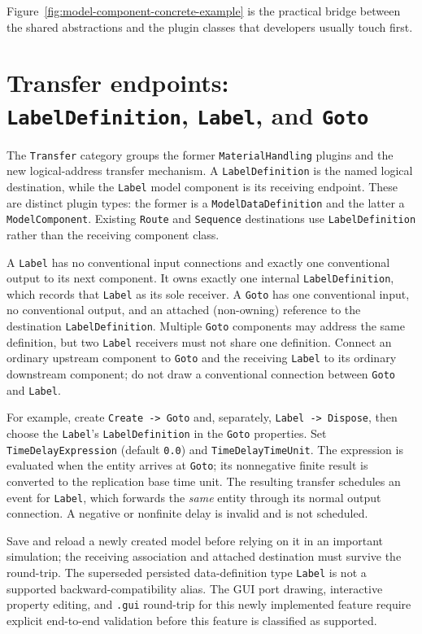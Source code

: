 Figure~\ref{fig:model-component-concrete-example} is the practical bridge
between the shared abstractions and the plugin classes that developers usually
touch first.


\section{Transfer endpoints: \texttt{LabelDefinition}, \texttt{Label}, and \texttt{Goto}}
\label{sec:transfer-label-goto-user}

The \texttt{Transfer} category groups the former \texttt{MaterialHandling}
plugins and the new logical-address transfer mechanism. A
\texttt{LabelDefinition} is the named logical destination, while the
\texttt{Label} model component is its receiving endpoint. These are distinct
plugin types: the former is a \texttt{ModelDataDefinition} and the latter a
\texttt{ModelComponent}. Existing \texttt{Route} and \texttt{Sequence}
destinations use \texttt{LabelDefinition} rather than the receiving component
class.

A \texttt{Label} has no conventional input connections and exactly one
conventional output to its next component. It owns exactly one internal
\texttt{LabelDefinition}, which records that \texttt{Label} as its sole
receiver. A \texttt{Goto} has one conventional input, no conventional
output, and an attached (non-owning) reference to the destination
\texttt{LabelDefinition}. Multiple \texttt{Goto} components may address the
same definition, but two \texttt{Label} receivers must not share one
definition. Connect an ordinary upstream component to \texttt{Goto} and the
receiving \texttt{Label} to its ordinary downstream component; do not draw a
conventional connection between \texttt{Goto} and \texttt{Label}.

For example, create \texttt{Create -> Goto} and, separately,
\texttt{Label -> Dispose}, then choose the \texttt{Label}'s
\texttt{LabelDefinition} in the \texttt{Goto} properties. Set
\texttt{TimeDelayExpression} (default \texttt{0.0}) and
\texttt{TimeDelayTimeUnit}. The expression is evaluated when the entity
arrives at \texttt{Goto}; its nonnegative finite result is converted to
the replication base time unit. The resulting transfer schedules an event
for \texttt{Label}, which forwards the \emph{same} entity through its normal
output connection. A negative or nonfinite delay is invalid and is not
scheduled.

Save and reload a newly created model before relying on it in an important
simulation; the receiving association and attached destination must survive
the round-trip. The superseded persisted data-definition type
\texttt{Label} is not a supported backward-compatibility alias.
The GUI port drawing, interactive property editing, and \texttt{.gui}
round-trip for this newly implemented feature require explicit end-to-end
validation before this feature is classified as supported.
